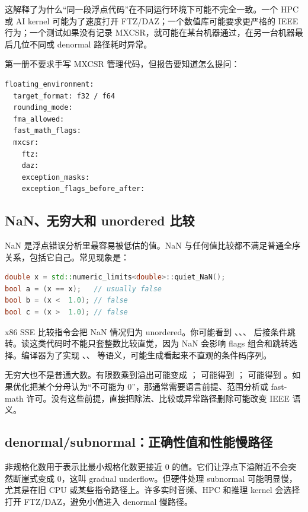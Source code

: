 这解释了为什么“同一段浮点代码”在不同运行环境下可能不完全一致。一个 HPC 或 AI kernel 可能为了速度打开 FTZ/DAZ；一个数值库可能要求更严格的 IEEE 行为；一个测试如果没有记录 MXCSR，就可能在某台机器通过，在另一台机器最后几位不同或 denormal 路径耗时异常。

第一册不要求手写 MXCSR 管理代码，但报告要知道怎么提问：

\begin{lstlisting}[numbers=none,caption={浮点环境报告字段}]
floating_environment:
  target_format: f32 / f64
  rounding_mode:
  fma_allowed:
  fast_math_flags:
  mxcsr:
    ftz:
    daz:
    exception_masks:
    exception_flags_before_after:
\end{lstlisting}

\subsection{NaN、无穷大和 unordered 比较}

NaN 是浮点错误分析里最容易被低估的值。NaN 与任何值比较都不满足普通全序关系，包括它自己。常见现象是：

\begin{lstlisting}[language=C++]
double x = std::numeric_limits<double>::quiet_NaN();
bool a = (x == x);   // usually false
bool b = (x <  1.0); // false
bool c = (x >  1.0); // false
\end{lstlisting}

x86 SSE 比较指令会把 NaN 情况归为 unordered。你可能看到 、、、 后接条件跳转。读这类代码时不能只套整数比较直觉，因为 NaN 会影响 flags 组合和跳转选择。编译器为了实现 、、 等语义，可能生成看起来不直观的条件码序列。

无穷大也不是普通大数。有限数乘到溢出可能变成 ； 可能得到 ； 可能得到 。如果优化把某个分母认为“不可能为 0”，那通常需要语言前提、范围分析或 fast-math 许可。没有这些前提，直接把除法、比较或异常路径删除可能改变 IEEE 语义。

\subsection{denormal/subnormal：正确性值和性能慢路径}

非规格化数用于表示比最小规格化数更接近 0 的值。它们让浮点下溢附近不会突然断崖式变成 0，这叫 gradual underflow。但硬件处理 subnormal 可能明显慢，尤其是在旧 CPU 或某些指令路径上。许多实时音频、HPC 和推理 kernel 会选择打开 FTZ/DAZ，避免小值进入 denormal 慢路径。

